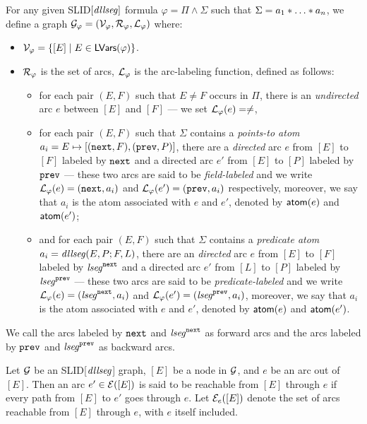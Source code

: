 \documentclass{llncs}
\begin{document}
\begin{definition}%
For any given SLID$[\mathit{dllseg}]$ formula $\varphi = \Pi \wedge \Sigma$ such that $\Sigma = a_1 \sep \dots \sep a_n$, we define a graph
 $\mathcal{G}_\varphi=(\mathcal{V}_\varphi, \mathcal{R}_\varphi,   \mathcal{L}_{\varphi})$ where:

\begin{itemize}
\item $\mathcal{V}_\varphi = \{[E] \mid E \in \mathsf{LVars}(\varphi)\}$.

\item  $\mathcal{R}_\varphi$ is the set of arcs, $\mathcal{L}_{\varphi}$ is the arc-labeling function, defined as follows:
\begin{itemize}
\item for each pair $(E, F)$ such that $E \neq F$ occurs in $\Pi$, there is an \emph{undirected} arc $e$ between $[E]$ and $[F]$ --- we set $\mathcal{L}_{\varphi}(e) =\neq$,
%
\item for each pair $(E,F)$ such that $\Sigma$ contains a \emph{points-to atom} $a_i=E \mapsto [(\mathtt{next},F), (\mathtt{prev},P)]$, there are a \emph{directed} arc $e$ from $[E]$ to $[F]$ labeled by $\mathtt{next}$ and a directed arc $e'$ from $[E]$ to $[P]$ labeled by $\mathtt{prev}$ --- these two arcs are said to be \emph{field-labeled} and we write $\mathcal{L}_{\varphi}(e)= (\mathtt{next},a_i)$ and $\mathcal{L}_{\varphi}(e')= (\mathtt{prev},a_i)$ respectively, moreover, we say that $a_i$ is the atom associated with $e$ and $e'$, denoted by $\mathsf{atom}(e)$ and $\mathsf{atom}({e'})$;

%
\item and for each pair $(E,F)$ such that $\Sigma$ contains a \emph{predicate atom} $a_i=\mathit{dllseg}(E, P;F, L)$, there are an \emph{directed} arc $e$ from $[E]$ to $[F]$ labeled by $\mathit{lseg}^{\mathtt{next}}$ and a directed arc $e'$ from $[L]$ to $[P]$ labeled by $\mathit{lseg}^{\mathtt{prev}}$  --- these two arcs are said to be \emph{predicate-labeled}  and we write $\mathcal{L}_{\varphi}(e)= (\mathit{lseg}^{\mathtt{next}},a_i)$ and $\mathcal{L}_\varphi(e')=(\mathit{lseg}^{\mathtt{prev}}, a_i)$, moreover, we say that $a_i$ is the atom associated with $e$ and $e'$, denoted by $\mathsf{atom}(e)$ and $\mathsf{atom}({e'})$. 
\end{itemize}
\end{itemize}
We call the arcs labeled by $\mathtt{next}$ and $\mathit{lseg}^{\mathtt{next}}$ as forward arcs and the arcs labeled by $\mathtt{prev}$ and $\mathit{lseg}^{\mathtt{prev}}$ as backward arcs.
\end{definition}

\begin{definition}
Let $\mathcal{G}$ be an SLID[$\mathit{dllseg}$] graph, $[E]$ be a node in $\mathcal{G}$, and $e$ be an arc out of $[E]$. Then an arc $e' \in \mathcal{E}([E])$ is said to be reachable from $[E]$ through $e$ if every path from $[E]$ to $e'$ goes through $e$. Let $\mathcal{E}_{e}([E])$ denote the set of arcs reachable from $[E]$ through $e$, with $e$ itself included.
\end{definition}
\end{document}
